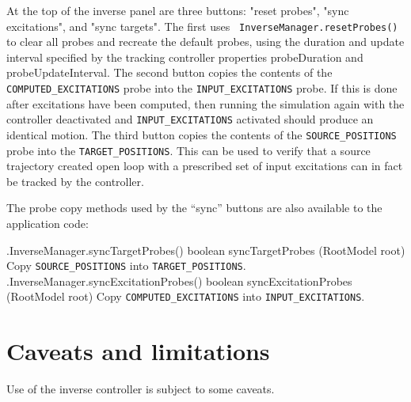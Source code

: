 At the top of the inverse panel are three buttons: {\sf "reset probes"}, {\sf
"sync excitations"}, and {\sf "sync targets"}. The first uses {\tt
InverseManager.resetProbes()} to clear all probes and recreate the default
probes, using the duration and update interval specified by the tracking
controller properties {\sf probeDuration} and {\sf probeUpdateInterval}.  The
second button copies the contents of the {\tt COMPUTED\_EXCITATIONS} probe into
the {\tt INPUT\_EXCITATIONS} probe. If this is done after excitations have been
computed, then running the simulation again with the controller deactivated and
{\tt INPUT\_EXCITATIONS} activated should produce an identical motion.  The
third button copies the contents of the {\tt SOURCE\_POSITIONS} probe into the
{\tt TARGET\_POSITIONS}. This can be used to verify that a source trajectory
created open loop with a prescribed set of input excitations can in fact be
tracked by the controller.

The probe copy methods used by the ``sync'' buttons are also available
to the application code:
%
\begin{methodtable}{0.45}{0.55}
\midline
\methodentry
{\inverse.InverseManager.syncTargetProbes()}%
{boolean syncTargetProbes (RootModel root)}%
{Copy {\tt SOURCE\_POSITIONS} into {\tt TARGET\_POSITIONS}.}%
%
\methodentry
{\inverse.InverseManager.syncExcitationProbes()}%
{boolean syncExcitationProbes (RootModel root)}%
{Copy {\tt COMPUTED\_EXCITATIONS} into {\tt INPUT\_EXCITATIONS}.}%
%
\midline
\end{methodtable}

\section{Caveats and limitations}

Use of the inverse controller is subject to some caveats.

